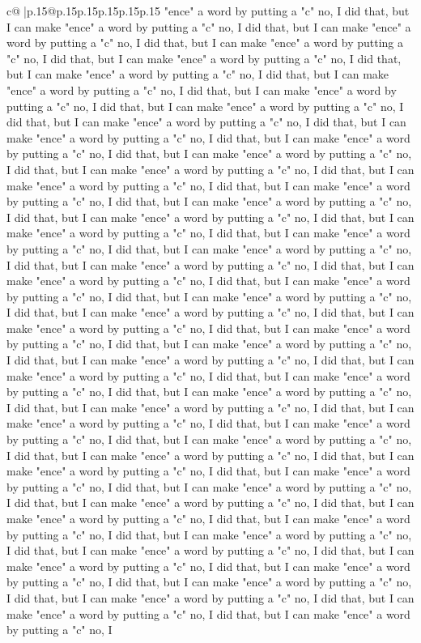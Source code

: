 \documentclass{article}
\begin{document}
{\begin{supertabular}{c@{$\;$}|p{.15\linewidth}@{}p{.15\linewidth}p{.15\linewidth}p{.15\linewidth}p{.15\linewidth}p{.15\linewidth}}
{{{"ence" a word by putting a "c" no, I did that, but I can make "ence" a word by putting a "c" no, I did that, but I can make "ence" a word by putting a "c" no, I did that, but I can make "ence" a word by putting a "c" no, I did that, but I can make "ence" a word by putting a "c" no, I did that, but I can make "ence" a word by putting a "c" no, I did that, but I can make "ence" a word by putting a "c" no, I did that, but I can make "ence" a word by putting a "c" no, I did that, but I can make "ence" a word by putting a "c" no, I did that, but I can make "ence" a word by putting a "c" no, I did that, but I can make "ence" a word by putting a "c" no, I did that, but I can make "ence" a word by putting a "c" no, I did that, but I can make "ence" a word by putting a "c" no, I did that, but I can make "ence" a word by putting a "c" no, I did that, but I can make "ence" a word by putting a "c" no, I did that, but I can make "ence" a word by putting a "c" no, I did that, but I can make "ence" a word by putting a "c" no, I did that, but I can make "ence" a word by putting a "c" no, I did that, but I can make "ence" a word by putting a "c" no, I did that, but I can make "ence" a word by putting a "c" no, I did that, but I can make "ence" a word by putting a "c" no, I did that, but I can make "ence" a word by putting a "c" no, I did that, but I can make "ence" a word by putting a "c" no, I did that, but I can make "ence" a word by putting a "c" no, I did that, but I can make "ence" a word by putting a "c" no, I did that, but I can make "ence" a word by putting a "c" no, I did that, but I can make "ence" a word by putting a "c" no, I did that, but I can make "ence" a word by putting a "c" no, I did that, but I can make "ence" a word by putting a "c" no, I did that, but I can make "ence" a word by putting a "c" no, I did that, but I can make "ence" a word by putting a "c" no, I did that, but I can make "ence" a word by putting a "c" no, I did that, but I can make "ence" a word by putting a "c" no, I did that, but I can make "ence" a word by putting a "c" no, I did that, but I can make "ence" a word by putting a "c" no, I did that, but I can make "ence" a word by putting a "c" no, I did that, but I can make "ence" a word by putting a "c" no, I did that, but I can make "ence" a word by putting a "c" no, I did that, but I can make "ence" a word by putting a "c" no, I did that, but I can make "ence" a word by putting a "c" no, I did that, but I can make "ence" a word by putting a "c" no, I did that, but I can make "ence" a word by putting a "c" no, I did that, but I can make "ence" a word by putting a "c" no, I did that, but I can make "ence" a word by putting a "c" no, I did that, but I can make "ence" a word by putting a "c" no, I did that, but I can make "ence" a word by putting a "c" no, I did that, but I can make "ence" a word by putting a "c" no, I did that, but I can make "ence" a word by putting a "c" no, I did that, but I can make "ence" a word by putting a "c" no, I did that, but I can make "ence" a word by putting a "c" no, I did that, but I can make "ence" a word by putting a "c" no, I did that, but I can make "ence" a word by putting a "c" no, I }}}
\end{supertabular}}
\end{document}
